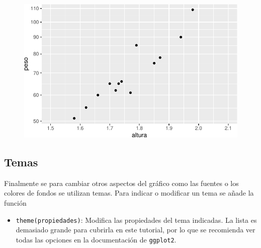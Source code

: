 \documentclass[
  a4paper,
]{scrreport}
\providecommand{\tightlist}{%
  \setlength{\itemsep}{0pt}\setlength{\parskip}{0pt}}\usepackage{longtable,booktabs,array}
\theoremstyle{definition}
\theoremstyle{definition}
\theoremstyle{remark}
\begin{document}
\begin{figure}[H]

{\centering \includegraphics{./07-graficos_files/figure-pdf/unnamed-chunk-29-1.pdf}

}

\end{figure}

\hypertarget{temas}{%
\subsection{Temas}\label{temas}}

Finalmente se para cambiar otros aspectos del gráfico como las fuentes o
los colores de fondos se utilizan temas. Para indicar o modificar un
tema se añade la función

\begin{itemize}
\tightlist
\item
  \texttt{theme(propiedades)}: Modifica las propiedades del tema
  indicadas. La lista es demasiado grande para cubrirla en este
  tutorial, por lo que se recomienda ver todas las opciones en la
  documentación de \texttt{ggplot2}.
\end{itemize}
\end{document}
